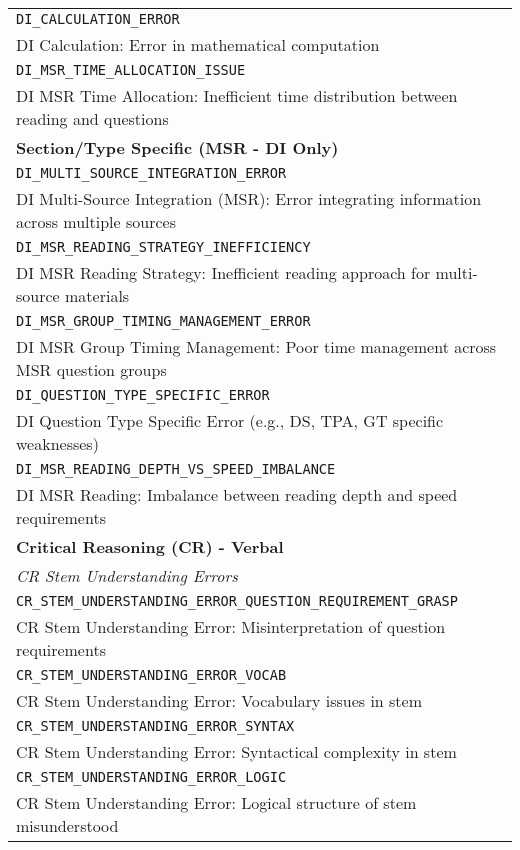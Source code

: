 \documentclass{article}
\begin{document}
{\begin{longtable}{|p{}|}
\hline
\texttt{DI\_CALCULATION\_ERROR} \\
DI Calculation: Error in mathematical computation \\
\hline
\texttt{DI\_MSR\_TIME\_ALLOCATION\_ISSUE} \\
DI MSR Time Allocation: Inefficient time distribution between reading and questions \\
\hline
\textbf{Section/Type Specific (MSR - DI Only)} \\
\hline
\texttt{DI\_MULTI\_SOURCE\_INTEGRATION\_ERROR} \\
DI Multi-Source Integration (MSR): Error integrating information across multiple sources \\
\hline
\texttt{DI\_MSR\_READING\_STRATEGY\_INEFFICIENCY} \\
DI MSR Reading Strategy: Inefficient reading approach for multi-source materials \\
\hline
\texttt{DI\_MSR\_GROUP\_TIMING\_MANAGEMENT\_ERROR} \\
DI MSR Group Timing Management: Poor time management across MSR question groups \\
\hline
\texttt{DI\_QUESTION\_TYPE\_SPECIFIC\_ERROR} \\
DI Question Type Specific Error (e.g., DS, TPA, GT specific weaknesses) \\
\hline
\texttt{DI\_MSR\_READING\_DEPTH\_VS\_SPEED\_IMBALANCE} \\
DI MSR Reading: Imbalance between reading depth and speed requirements \\
\hline
\textbf{Critical Reasoning (CR) - Verbal} \\
\hline
\textit{CR Stem Understanding Errors} \\
\hline
\texttt{CR\_STEM\_UNDERSTANDING\_ERROR\_QUESTION\_REQUIREMENT\_GRASP} \\
CR Stem Understanding Error: Misinterpretation of question requirements \\
\hline
\texttt{CR\_STEM\_UNDERSTANDING\_ERROR\_VOCAB} \\
CR Stem Understanding Error: Vocabulary issues in stem \\
\hline
\texttt{CR\_STEM\_UNDERSTANDING\_ERROR\_SYNTAX} \\
CR Stem Understanding Error: Syntactical complexity in stem \\
\hline
\texttt{CR\_STEM\_UNDERSTANDING\_ERROR\_LOGIC} \\
CR Stem Understanding Error: Logical structure of stem misunderstood \\

\end{longtable}}
\end{document}
